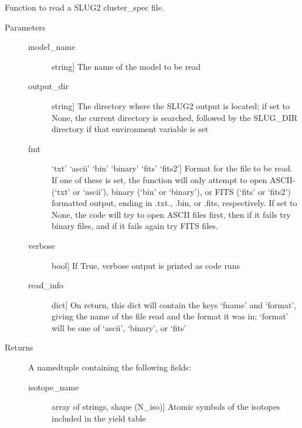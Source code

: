 \documentclass[letterpaper,10pt,english]{sphinxmanual}
\begin{document}

\begin{fulllineitems}
\label{\detokenize{slugpy:slugpy.read_cluster_yield}}
Function to read a SLUG2 cluster\_spec file.
\begin{description}
\item[{Parameters}] \leavevmode\begin{description}
\item[{model\_name}] \leavevmode{[}string{]}
The name of the model to be read

\item[{output\_dir}] \leavevmode{[}string{]}
The directory where the SLUG2 output is located; if set to None,
the current directory is searched, followed by the SLUG\_DIR
directory if that environment variable is set

\item[{fmt}] \leavevmode{[}‘txt’ \textbar{} ‘ascii’ \textbar{} ‘bin’ \textbar{} ‘binary’ \textbar{} ‘fits’ \textbar{} ‘fits2’{]}
Format for the file to be read. If one of these is set, the
function will only attempt to open ASCII-(‘txt’ or ‘ascii’), 
binary (‘bin’ or ‘binary’), or FITS (‘fits’ or ‘fits2’)
formatted output, ending in .txt., .bin, or .fits,
respectively. If set to None, the code will try to open
ASCII files first, then if it fails try binary files, and if
it fails again try FITS files.

\item[{verbose}] \leavevmode{[}bool{]}
If True, verbose output is printed as code runs

\item[{read\_info}] \leavevmode{[}dict{]}
On return, this dict will contain the keys ‘fname’ and
‘format’, giving the name of the file read and the format it
was in; ‘format’ will be one of ‘ascii’, ‘binary’, or ‘fits’

\end{description}

\item[{Returns}] \leavevmode
A namedtuple containing the following fields:
\begin{description}
\item[{isotope\_name}] \leavevmode{[}array of strings, shape (N\_iso){]}
Atomic symbols of the isotopes included in the yield table


\end{description}
\end{description}
\end{fulllineitems}
\end{document}
